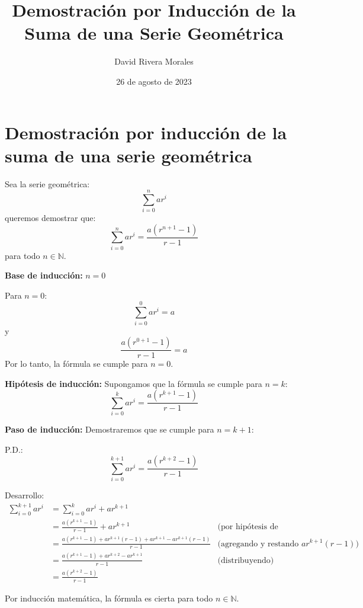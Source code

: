 \documentclass{article}
\begin{document}
\title{Demostración por Inducción de la Suma de una Serie Geométrica}
\author{David Rivera Morales}
\date{26 de agosto de 2023}

\maketitle

\section*{Demostración por inducción de la suma de una serie geométrica}

Sea la serie geométrica:
\[
\sum_{i=0}^{n} ar^i
\]
queremos demostrar que:
\[
\sum_{i=0}^{n} ar^i = \frac{a(r^{n+1}-1)}{r-1}
\]
para todo \( n \in \mathbb{N} \).

\textbf{Base de inducción:} \( n = 0 \)

Para \( n = 0 \):
\[
\sum_{i=0}^{0} ar^i = a
\]
y
\[
\frac{a(r^{0+1}-1)}{r-1} = a
\]
Por lo tanto, la fórmula se cumple para \( n = 0 \).

\textbf{Hipótesis de inducción:} Supongamos que la fórmula se cumple para \( n = k \):
\[
\sum_{i=0}^{k} ar^i = \frac{a(r^{k+1}-1)}{r-1}
\]

\textbf{Paso de inducción:} Demostraremos que se cumple para \( n = k+1 \):

P.D.:
\[
\sum_{i=0}^{k+1} ar^i = \frac{a(r^{k+2}-1)}{r-1}    
\]

Desarrollo:
\begin{align*}
\sum_{i=0}^{k+1} ar^i &= \sum_{i=0}^{k} ar^i + ar^{k+1} \\
&= \frac{a(r^{k+1}-1)}{r-1} + ar^{k+1} & \text{(por hipótesis de inducción)} \\
&= \frac{a(r^{k+1} - 1) + ar^{k+1}(r-1) + ar^{k+1} - ar^{k+1}(r-1)}{r-1} & \text{(agregando y restando } ar^{k+1}(r-1) \text{)} \\
&= \frac{a(r^{k+1}-1) + ar^{k+2} - ar^{k+1}}{r-1} & \text{(distribuyendo)} \\
&= \frac{a(r^{k+2}-1)}{r-1}
\end{align*}

Por inducción matemática, la fórmula es cierta para todo \( n \in \mathbb{N} \).
\end{document}
